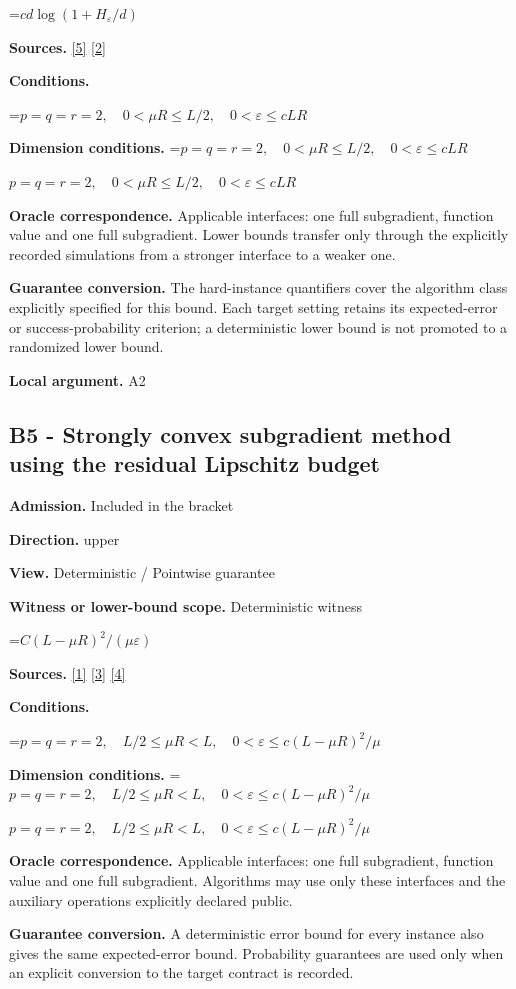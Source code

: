 \documentclass[10pt,a4paper]{article}
\newcommand{\AtlasMath}[1]{\par\begingroup\centering\setbox0=\hbox{$\displaystyle #1$}\ifdim\wd0>1.4\linewidth\typeout{ATLAS WIDE FORMULA: \the\wd0}\fi\ifdim\wd0>\linewidth\resizebox{\linewidth}{!}{\box0}\else\box0\fi\par\endgroup}
\newcommand{\AtlasInlineMath}[1]{\begingroup\setbox0=\hbox{$#1$}\ifdim\wd0>.4\linewidth\endgroup\AtlasMath{#1}\else\endgroup$#1$\fi}
\begin{document}
\AtlasMath{c d\log(1+H_\varepsilon/d)}
\textbf{Sources.} \href{https://arxiv.org/pdf/1407.5144}{[5]} \href{https://arxiv.org/pdf/1401.1792}{[2]}

\textbf{Conditions.} 
\AtlasMath{p=q=r=2,\quad0<\mu R\le L/2,\quad0<\varepsilon\le cLR}


\textbf{Dimension conditions.} \AtlasInlineMath{p=q=r=2,\quad0<\mu R\le L/2,\quad0<\varepsilon\le cLR}

\textbf{Oracle correspondence.} Applicable interfaces: one full subgradient, function value and one full subgradient. Lower bounds transfer only through the explicitly recorded simulations from a stronger interface to a weaker one.

\textbf{Guarantee conversion.} The hard-instance quantifiers cover the algorithm class explicitly specified for this bound. Each target setting retains its expected-error or success-probability criterion; a deterministic lower bound is not promoted to a randomized lower bound.

\textbf{Local argument.} A2

\subsection{B5 - Strongly convex subgradient method using the residual Lipschitz budget}
\textbf{Admission.} Included in the bracket

\textbf{Direction.} upper

\textbf{View.} Deterministic / Pointwise guarantee

\textbf{Witness or lower-bound scope.} Deterministic witness

\AtlasMath{C(L-\mu R)^2/(\mu\varepsilon)}
\textbf{Sources.} \href{https://arxiv.org/pdf/1405.4980}{[1]} \href{https://www2.isye.gatech.edu/~nemirovs/MOR_AccuracyCertificates.pdf}{[3]} \href{https://arxiv.org/pdf/2609.20701}{[4]}

\textbf{Conditions.} 
\AtlasMath{p=q=r=2,\quad L/2\le\mu R<L,\quad0<\varepsilon\le c(L-\mu R)^2/\mu}


\textbf{Dimension conditions.} \AtlasInlineMath{p=q=r=2,\quad L/2\le\mu R<L,\quad0<\varepsilon\le c(L-\mu R)^2/\mu}

\textbf{Oracle correspondence.} Applicable interfaces: one full subgradient, function value and one full subgradient. Algorithms may use only these interfaces and the auxiliary operations explicitly declared public.

\textbf{Guarantee conversion.} A deterministic error bound for every instance also gives the same expected-error bound. Probability guarantees are used only when an explicit conversion to the target contract is recorded.
\end{document}
